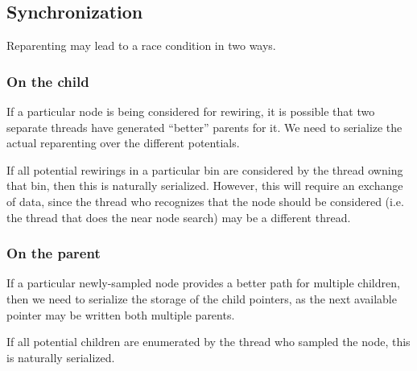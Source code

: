 \begin{figure}[h]
\begin{centering}
    \texttt{[image: \\figfile\{fig/child\_list]}}
    \caption{Linked-list of arrays}
\end{centering} 
\end{figure}

\subsection{Synchronization}

Reparenting may lead to a race condition in two ways. 

\subsubsection{On the child}
If a particular node is being considered for rewiring, it is possible that two separate threads have generated ``better'' parents for it. We need to serialize the actual reparenting over the different potentials. 

If all potential rewirings in a particular bin are considered by the thread owning that bin, then this is naturally serialized. However, this will require an exchange of data, since the thread who recognizes that the node should be considered (i.e. the thread that does the near node search) may be a different thread.



\subsubsection{On the parent}
If a particular newly-sampled node provides a better path for multiple children, then we need to serialize the storage of the child pointers, as the next available pointer may be written both multiple parents. 

If all potential children are enumerated by the thread who sampled the node, this is naturally serialized.










 